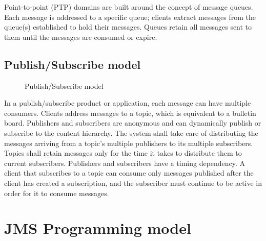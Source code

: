 \documentclass[9pt,twocolumn,twoside]{styles/osajnl}
\begin{document}
Point-to-point (PTP) domains are built around the concept of message
queues.  Each message is addressed to a specific queue; clients
extract messages from the queue(s) established to hold their
messages. Queues retain all messages sent to them until the messages
are consumed or expire.

\subsection{Publish/Subscribe model}

\begin{figure}[htbp]
\centering
{}
\caption{\cite{www-jms-tutorialoracle} Publish/Subscribe model}
\label{fig: Publish/Subscribe messaging}
\end{figure}

In a publish/subscribe product or application, each message can have
multiple consumers. Clients address messages to a topic, which is
equivalent to a bulletin board. Publishers and subscribers are
anonymous and can dynamically publish or subscribe to the content
hierarchy. The system shall take care of distributing the messages
arriving from a topic’s multiple publishers to its multiple
subscribers. Topics shall retain messages only for the time it takes
to distribute them to current subscribers.  Publishers and subscribers
have a timing dependency. A client that subscribes to a topic can
consume only messages published after the client has created a
subscription, and the subscriber must continue to be active in order
for it to consume messages. \cite{www-jms-tutorialoracle}


\section{JMS Programming model}
\end{document}
